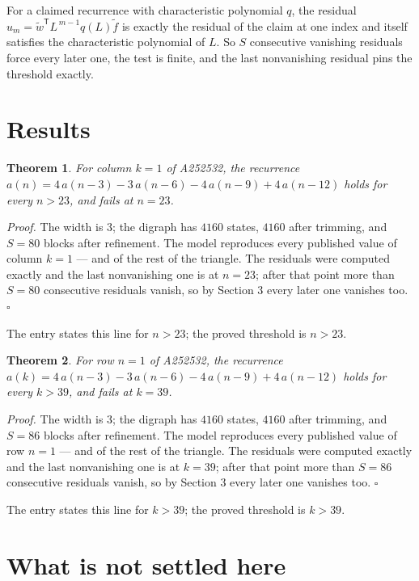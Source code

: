 \documentclass[11pt]{article}
\newtheorem{theorem}{Theorem}
\theoremstyle{definition}
\begin{document}
For a claimed recurrence with characteristic polynomial $q$, the residual $u_m = \tilde w^{\mathsf T}L^{\,m-1}q(L)\tilde f$ is exactly the residual of the claim at one index and itself satisfies the characteristic polynomial of $L$. So $S$ consecutive vanishing residuals force every later one, the test is finite, and the last nonvanishing residual pins the threshold exactly.

\section{Results}

\begin{theorem} For column $k = 1$ of A252532, the recurrence $a(n) = 4\,a(n-3) - 3\,a(n-6) - 4\,a(n-9) + 4\,a(n-12)$ holds for every $n > 23$, and fails at $n = 23$.\end{theorem}

{\itshape Proof.} The width is $3$; the digraph has $4160$ states, $4160$ after trimming, and $S = 80$ blocks after refinement. The model reproduces every published value of column $k = 1$ --- and of the rest of the triangle. The residuals were computed exactly and the last nonvanishing one is at $n = 23$; after that point more than $S = 80$ consecutive residuals vanish, so by Section 3 every later one vanishes too. $\square$

The entry states this line for $n > 23$; the proved threshold is $n > 23$.

\begin{theorem} For row $n = 1$ of A252532, the recurrence $a(k) = 4\,a(n-3) - 3\,a(n-6) - 4\,a(n-9) + 4\,a(n-12)$ holds for every $k > 39$, and fails at $k = 39$.\end{theorem}

{\itshape Proof.} The width is $3$; the digraph has $4160$ states, $4160$ after trimming, and $S = 86$ blocks after refinement. The model reproduces every published value of row $n = 1$ --- and of the rest of the triangle. The residuals were computed exactly and the last nonvanishing one is at $k = 39$; after that point more than $S = 86$ consecutive residuals vanish, so by Section 3 every later one vanishes too. $\square$

The entry states this line for $k > 39$; the proved threshold is $k > 39$.

\section{What is not settled here}
\end{document}
